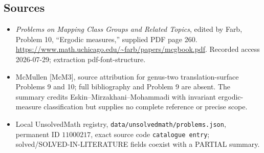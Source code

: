 \documentclass[11pt]{article}
\begin{document}
\subsection{Sources}
\begin{itemize}
\item \emph{Problems on Mapping Class Groups and Related Topics}, edited by Farb, Problem 10, ``Ergodic measures,'' supplied PDF page 260. \url{https://www.math.uchicago.edu/~farb/papers/mcgbook.pdf}. Recorded access 2026-07-29; extraction pdf-font-structure.
\item McMullen [McM3], source attribution for genus-two translation-surface Problems 9 and 10; full bibliography and Problem 9 are absent. The summary credits Eskin--Mirzakhani--Mohammadi with invariant ergodic-measure classification but supplies no complete reference or precise scope.
\item Local UnsolvedMath registry, \texttt{data/unsolvedmath/problems.json}, permanent ID \(11000217\), exact source code \texttt{catalogue entry}; solved/SOLVED-IN-LITERATURE fields coexist with a PARTIAL summary.
\end{itemize}
\end{document}
